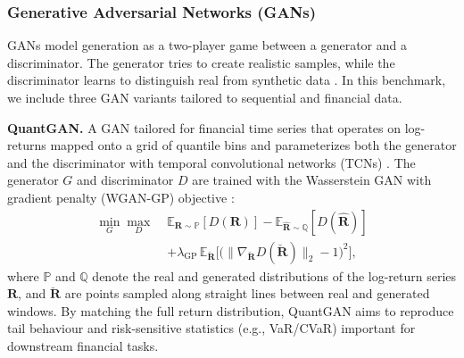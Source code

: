     \subsubsection{Generative Adversarial Networks (GANs)}
    GANs model generation as a two-player game between a generator and
    a discriminator. The generator tries to create realistic samples,
    while the discriminator learns to distinguish real from synthetic
    data \cite{Goodfellow14}. In this benchmark, we include three GAN
    variants tailored to sequential and financial data.

    \begin{enumerate}[label=\textbf{[A\arabic*]},resume]
      \item \label{alg:quantgan} \textbf{QuantGAN.}
      A GAN tailored for financial time series that operates on
      log-returns mapped onto a grid of quantile bins and
      parameterizes both the generator and the discriminator with
      temporal convolutional networks (TCNs) \cite{Wiese2020}. The
      generator \(G\) and discriminator \(D\) are trained with the
      Wasserstein GAN with gradient penalty (WGAN-GP) objective
      \cite{Arjovsky17}:
      \begin{equation}
        \begin{split}
          \min_G \max_D \; & \mathbb{E}_{\mathbf{R}\sim\mathbb{P}}[D(\mathbf{R})] -
          \mathbb{E}_{\hat{\mathbf{R}}\sim\mathbb{Q}}[D(\hat{\mathbf{R}})] \\
          &+ \lambda_{\mathrm{GP}}\, \mathbb{E}_{\breve{\mathbf{R}}}\Big[
          \big(\|\nabla_{\breve{\mathbf{R}}} D(\breve{\mathbf{R}})\|_2 - 1\big)^2\Big],
        \end{split}
        \label{eq:quantgan}
      \end{equation}
      where \(\mathbb{P}\) and \(\mathbb{Q}\) denote the real and
      generated distributions of the log-return series
      \(\mathbf{R}\), and \(\breve{\mathbf{R}}\) are points sampled
      along straight lines between real and generated windows. By
      matching the full return distribution, QuantGAN aims to
      reproduce tail behaviour and risk-sensitive statistics (e.g.,
      VaR/CVaR) important for downstream financial tasks.


\end{enumerate}
